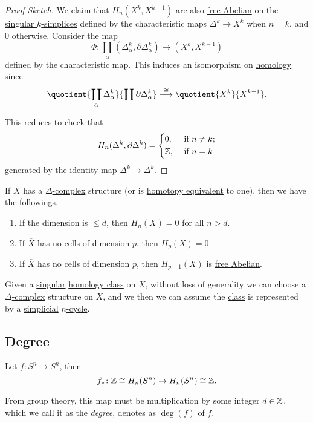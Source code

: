\begin{proof}[Proof Sketch]
	We claim that \(H_n(X^k, X^{k - 1})\) are also \hyperref[def:free-Abelian-group]{free Abelian} on the
	\hyperref[def:singular-simplex]{singular \(k\)-simplices} defined by the characteristic maps \(\Delta^k \to X^k\) when \(n = k\),
	and \(0\) otherwise. Consider the map
	\[
		\Phi \colon \coprod_\alpha (\Delta^k_\alpha, \partial \Delta^k_\alpha) \to (X^k, X^{k - 1})
	\]
	defined by the characteristic map. This induces an isomorphism on \hyperref[def:homology-group]{homology} since
	\[
		\quotient{\coprod_\alpha \Delta_\alpha^k}{\coprod \partial \Delta_\alpha^k} \overset{\cong}{\longrightarrow}  \quotient{X^k}{X^{k - 1}}.
	\]

	This reduces to check that
	\[
		H_n(\Delta^k, \partial \Delta^k) = \begin{dcases}
			0,                           & \text{ if } n \neq k ; \\
			\mathbb{\MakeUppercase{z}} , & \text{ if } n=k
		\end{dcases}
	\]
	generated by the identity map \(\Delta^k \to \Delta^k\).
\end{proof}

\begin{corollary}
	If \(X\) has a \hyperref[def:delta-complex]{\(\Delta \)-complex} structure (or is
	\hyperref[def:homotopy-equivalence]{homotopy equivalent} to one), then we have the followings.
	\begin{enumerate}
		\item If the dimension is \(\leq d\), then \(H_n(X) = 0\) for all \(n>d\).
		\item If \(\overline{X} \) has no cells of dimension \(p\), then \(H_p(X) = 0\).
		\item If \(\overline{X} \) has no cells of dimension \(p\), then \(H_{p-1}(X)\) is \hyperref[def:free-Abelian-group]{free Abelian}.
	\end{enumerate}
\end{corollary}

\begin{corollary}
	Given a \hyperref[def:singular-homology-group]{singular} \hyperref[def:homology-class]{homology class} on \(X\), without loss of generality we can choose a
	\hyperref[def:delta-complex]{\(\Delta \)-complex} structure on \(X\), and we then we can assume the \hyperref[def:homology-class]{class} is represented by a
	\hyperref[def:simplicial-complex]{simplicial} \hyperref[def:cycle]{\(n\)-cycle}.
\end{corollary}

\subsection{Degree}
\begin{definition}[Degree]\label{def:degree}
	Let \(f \colon S^n \to S^n\), then
	\[
		f_\ast \colon \mathbb{\MakeUppercase{z}} \cong H_n(S^n) \to H_n(S^n) \cong \mathbb{\MakeUppercase{z}}.
	\]

	From group theory, this map must be multiplication by some integer \(d \in \mathbb{\MakeUppercase{z}}\), which we call it as the
	\emph{degree}, denotes as \(\deg(f)\) of \(f\).
\end{definition}

